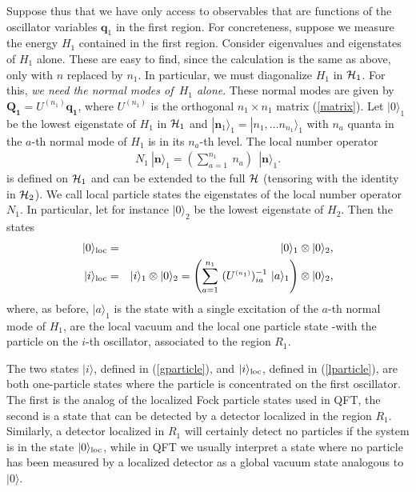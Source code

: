 \documentclass[10pt, nofootinbib]{revtex4}
\newcommand{\bea}{\begin{eqnarray}}
\newcommand{\eea}{\end{eqnarray}}
\begin{document}
Suppose thus that we have only access to observables that are
functions of the oscillator variables $\mathbf q_{1}$ in the first
region.  For concreteness, suppose we measure the energy $H_{1}$
contained in the first region.  Consider eigenvalues and eigenstates
of $H_{1}$ alone.  These are easy to find, since the calculation is
the same as above, only with $n$ replaced by $n_{1}$.  In particular,
we must diagonalize $H_{1}$ in ${\cal H}_{1}$.  For this, \emph{we
need the normal modes of\ $H_{1}$ alone}.  These normal modes are
given by $\mathbf{Q_1}= U^{\scriptscriptstyle{(n_{1})}}
\mathbf{q_{1}}$, where $ U^{\scriptscriptstyle{(n_{1})}}$ is the
orthogonal $n_{1} \times n_{1}$ matrix (\ref{matrix}).  Let
$|0\rangle_{1}$ be the lowest eigenstate of $H_{1}$ in ${\cal H}_{1}$
and $|\mathbf
n_{1}\rangle_{1}= |n_{1}, \ldots n_{n_1}\rangle_{1}$ with $n_{a}$
quanta in the $a$-th normal mode of $H_{1}$ is in its $n_{a}$-th level.   The 
local number operator 
%
\bea N_{1} \ |\mathbf n \rangle_{1} = \left(\sum_{a=1}^{n_{1}}\
n_{a}\right)\ \ |\mathbf n\rangle_{1} \label{numberop1}.  \eea
%
is defined on ${\cal H}_1$ and can be extended to the full $\cal H$
(tensoring with the identity in ${\cal H}_2$).  We call local particle
states the eigenstates of the local number operator $N_{1}$.  In
particular, let for instance $|0\rangle_{2}$ be the lowest eigenstate
of $H_{2}$.  Then the states
%
\bea 
| 0 \rangle_{\rm loc} &=& | 0 \rangle_{1} \otimes | 0 \rangle_{2}, \\
| i \rangle_{\rm loc} &=& | i\rangle_{1}\otimes | 0\rangle_{2} =   \left(\sum_{a=1}^{n_{1}}\ 
(U^{\scriptscriptstyle{(n_{1})}})^{-1}_{ia}\ |a\rangle_{1}
\right)\otimes | 0\rangle_{2} ,
\label{lparticle}
\eea
%
where, as before, $ |a\rangle_{1}$ is the state with a single
excitation of the $a$-th normal mode of $H_{1}$, are the local vacuum
and the local one particle state -with the particle on the $i$-th
oscillator, associated to the region $R_{1}$.

The two states $| i \rangle$, defined in (\ref{gparticle}), and $| i
\rangle_{\rm loc}$, defined in (\ref{lparticle}), are both
one-particle states where the particle is concentrated on the first
oscillator.  The first is the analog of the localized Fock particle
states used in QFT, the second is a state that can be detected by a
detector localized in the region $R_{1}$.  Similarly, a detector
localized in $R_{1}$ will certainly detect no particles if the system
is in the state $| 0 \rangle_{\rm loc}$, while in QFT we usually
interpret a state where no particle has been measured by a localized
detector as a global vacuum state analogous to $| 0 \rangle$.
\end{document}
